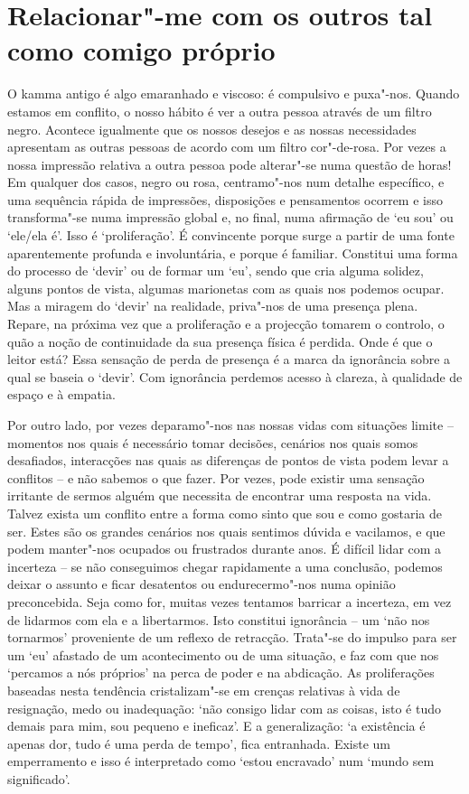 \section{Relacionar"-me com os outros tal como comigo próprio}

O kamma antigo é algo emaranhado e viscoso: é compulsivo e puxa"-nos. Quando estamos em conflito, o nosso hábito é ver a outra pessoa através de um filtro negro. Acontece igualmente que os nossos desejos e as nossas necessidades apresentam as outras pessoas de acordo com um filtro cor"-de-rosa. Por vezes a nossa impressão relativa a outra pessoa pode alterar"-se numa questão de horas! Em qualquer dos casos, negro ou rosa, centramo"-nos num detalhe específico, e uma sequência rápida de impressões, disposições e pensamentos ocorrem e isso transforma"-se numa impressão global e, no final, numa afirmação de `eu sou' ou `ele/ela é'. Isso é `proliferação'. É convincente porque surge a partir de uma fonte aparentemente profunda e involuntária, e porque é familiar. Constitui uma forma do processo de `devir' ou de formar um `eu', sendo que cria alguma solidez, alguns pontos de vista, algumas marionetas com as quais nos podemos ocupar. Mas a miragem do `devir' na realidade, priva"-nos de uma presença plena. Repare, na próxima vez que a proliferação e a projecção tomarem o controlo, o quão a noção de continuidade da sua presença física é perdida. Onde é que o leitor está? Essa sensação de perda de presença é a marca da ignorância sobre a qual se baseia o `devir'. Com ignorância perdemos acesso à clareza, à qualidade de espaço e à empatia.

Por outro lado, por vezes deparamo"-nos nas nossas vidas com situações limite -- momentos nos quais é necessário tomar decisões, cenários nos quais somos desafiados, interacções nas quais as diferenças de pontos de vista podem levar a conflitos -- e não sabemos o que fazer. Por vezes, pode existir uma sensação irritante de sermos alguém que necessita de encontrar uma resposta na vida. Talvez exista um conflito entre a forma como sinto que sou e como gostaria de ser. Estes são os grandes cenários nos quais sentimos dúvida e vacilamos, e que podem manter"-nos ocupados ou frustrados durante anos. É difícil lidar com a incerteza -- se não conseguimos chegar rapidamente a uma conclusão, podemos deixar o assunto e ficar desatentos ou endurecermo"-nos numa opinião preconcebida. Seja como for, muitas vezes tentamos barricar a incerteza, em vez de lidarmos com ela e a libertarmos. Isto constitui ignorância -- um `não nos tornarmos' proveniente de um reflexo de retracção. Trata"-se do impulso para ser um `eu' afastado de um acontecimento ou de uma situação, e faz com que nos `percamos a nós próprios' na perca de poder e na abdicação. As proliferações baseadas nesta tendência cristalizam"-se em crenças relativas à vida de resignação, medo ou inadequação: `não consigo lidar com as coisas, isto é tudo demais para mim, sou pequeno e ineficaz'. E a generalização: `a existência é apenas dor, tudo é uma perda de tempo', fica entranhada. Existe um emperramento e isso é interpretado como `estou encravado' num `mundo sem significado'.

